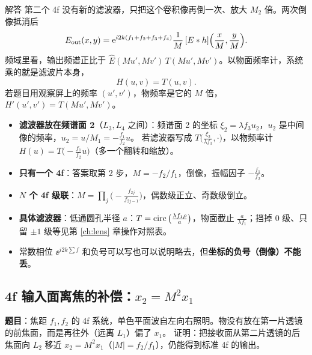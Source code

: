 \begin{exam}{解答}
第二个 4f 没有新的滤波器，只把这个卷积像再倒一次、放大 $M_2$ 倍。两次倒像抵消后
\[
E_{\text{out}}(x,y)=\mathrm{e}^{i2k(f_1+f_2+f_3+f_4)}\frac1M\,[E\ast h]\Big(\frac xM,\frac yM\Big).
\]
频域里看，输出频谱正比于 $\hat E(Mu',Mv')\,T(Mu',Mv')$。以物面频率计，系统乘的就是滤波片本身，
\[
\boxed{H(u,v)=T(u,v)} .
\]
若题目用观察屏上的频率 $(u',v')$，物频率是它的 $M$ 倍，$H'(u',v')=T(Mu',Mv')$。
\end{exam}

\begin{warn}[变式]
\begin{itemize}
\item \textbf{滤波器放在频谱面 2}（$L_3,L_4$ 之间）：频谱面 2 的坐标 $\xi_2=\lambda f_3u_2$，$u_2$ 是中间像的频率，$u_2=u/M_1=-\frac{f_1}{f_2}u$。
若滤波器写成 $T\big(\frac{\xi_2}{\lambda f_3},\cdot\big)$，以物频率计 $H(u)=T\big(-\frac{f_1}{f_2}u\big)$（多一个翻转和缩放）。
\item \textbf{只有一个 4f}：答案取第 2 步，$M=-f_2/f_1$，倒像，振幅因子 $-\frac{f_1}{f_2}$。
\item \textbf{$N$ 个 4f 级联}：$M=\prod_j\big(-\frac{f_{2j}}{f_{2j-1}}\big)$，偶数级正立、奇数级倒立。
\item \textbf{具体滤波器}：低通圆孔半径 $a$：$T=\operatorname{circ}\big(\frac{\lambda f_1\rho}{a}\big)$，物面截止 $\frac{a}{\lambda f_1}$；挡掉 0 级、只留 $\pm1$ 级等见第 \ref{ch:lens} 章操作对照表。
\item 常数相位 $\ee^{i2k\sum f}$ 和负号可以写也可以说明略去，但\textbf{坐标的负号（倒像）不能丢}。
\end{itemize}
\end{warn}

\subsection{4f 输入面离焦的补偿：$x_2=M^2x_1$}\label{ex:v-4fshift}
\noindent\textbf{题目}：焦距 $f_1,f_2$ 的 4f 系统，单色平面波自左向右照明。物没有放在第一片透镜的前焦面，而是再往外（远离 $L_1$）偏了 $x_1$。
证明：把接收面从第二片透镜的后焦面向 $L_2$ 移近 $x_2=M^2x_1$（$|M|=f_2/f_1$），仍能得到标准 4f 的输出。

